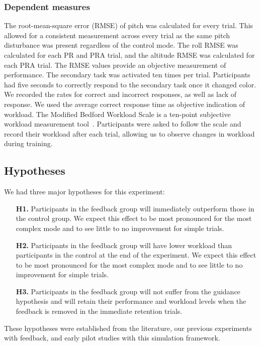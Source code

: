 \subsubsection{Dependent measures}
The root-mean-square error (RMSE) of pitch was calculated for every trial.
This allowed for a consistent measurement across every trial as the same pitch disturbance was present regardless of the control mode.
The roll RMSE was calculated for each PR and PRA trial, and the altitude RMSE was calculated for each PRA trial.
The RMSE values provide an objective measurement of performance.
The secondary task was activated ten times per trial.
Participants had five seconds to correctly respond to the secondary task once it changed color.
We recorded the rates for correct and incorrect responses, as well as lack of response.
We used the average correct response time as objective indication of workload.
The Modified Bedford Workload Scale is a ten-point subjective workload measurement tool~\citep{roscoe_subjective_1990}.
Participants were asked to follow the scale and record their workload after each trial, allowing us to observe changes in workload during training.

\subsection{Hypotheses}
We had three major hypotheses for this experiment:
\begin{itemize}
    \item[\textbf{H1.}] Participants in the feedback group will immediately outperform those in the control group. We expect this effect to be most pronounced for the most complex mode and to see little to no improvement for simple trials.
    \item[\textbf{H2.}] Participants in the feedback group will have lower workload than participants in the control at the end of the experiment. We expect this effect to be most pronounced for the most complex mode and to see little to no improvement for simple trials.
    \item[\textbf{H3.}] Participants in the feedback group will not suffer from the guidance hypothesis and will retain their performance and workload levels when the feedback is removed in the immediate retention trials.
\end{itemize}
These hypotheses were established from the literature, our previous experiments with feedback, and early pilot studies with this simulation framework.

